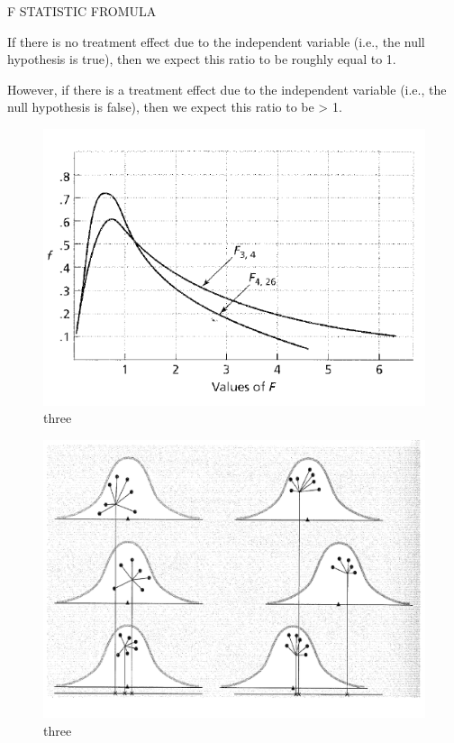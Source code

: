 \documentclass[]{book}
\theoremstyle{definition}
\theoremstyle{definition}
\theoremstyle{definition}
\theoremstyle{remark}
\begin{document}
{F STATISTIC FROMULA

If there is no treatment effect due to the independent variable (i.e.,
the null hypothesis is true), then we expect this ratio to be roughly
equal to 1.

However, if there is a treatment effect due to the independent variable
(i.e., the null hypothesis is false), then we expect this ratio to be
\textgreater{} 1.

\begin{figure}
\centering
\includegraphics{img/hicksanova4.png}
\caption{three}
\end{figure}

\begin{figure}
\centering
\includegraphics{img/hicksanova5.png}
\caption{three}
\end{figure}

}
\end{document}

